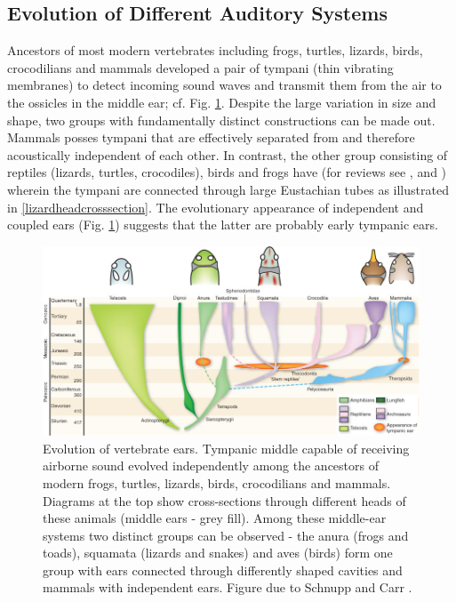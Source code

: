 \documentclass[12pt]{book}
\begin{document}
\subsection{Evolution of Different Auditory Systems}\label{auditoryevolution}
Ancestors of most modern vertebrates including frogs, turtles, lizards, birds, crocodilians and mammals
developed a pair of tympani (thin vibrating membranes) to detect incoming sound waves and transmit
them from the air to the ossicles in the middle ear; cf. Fig. \ref{vertebrateearevolution}. 
Despite the large variation in size and shape, two groups with fundamentally distinct constructions can be
made out. Mammals posses tympani that are effectively separated from and therefore acoustically 
independent of each other. In contrast, the other group consisting of reptiles (lizards, turtles, crocodiles), birds and frogs
have  (for reviews see \cite{carrsoares}, \cite{dalsgaardcarr} and \cite{schnuppcarr}) wherein
the tympani are connected through large Eustachian tubes as illustrated in \ref{lizardheadcrosssection}. The evolutionary 
appearance of independent and coupled ears (Fig. \ref{vertebrateearevolution}) suggests that the latter are probably early
tympanic ears.
\begin{figure}[ht!]
 \includegraphics[width=1.0\linewidth]{Diagrams/vertebrateearevolution.jpg}
 \caption[Vertebrate Ear Evolution]{Evolution of vertebrate ears. Tympanic
 middle capable of receiving airborne sound evolved independently among the ancestors of modern frogs, turtles, lizards, birds,
 crocodilians and mammals. Diagrams at the top show cross-sections through different heads of these animals (middle ears - grey fill).
 Among these middle-ear systems two distinct groups can be observed - the anura (frogs and toads), squamata (lizards and snakes)
 and aves (birds) form one group with ears connected through differently shaped cavities and mammals with independent ears. Figure due to Schnupp and Carr \cite{schnuppcarr}.}
 \label{vertebrateearevolution}
\end{figure}
\end{document}

